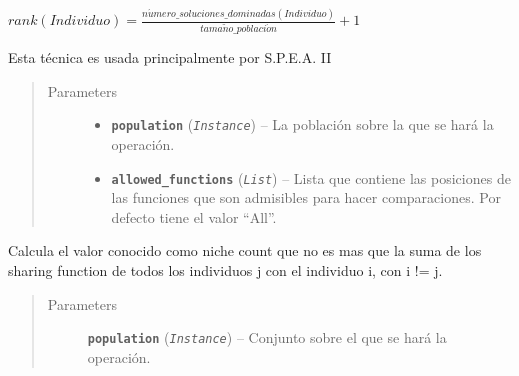 \documentclass[letterpaper,10pt,english]{sphinxmanual}
\begin{document}
\begin{fulllineitems}
\begin{fulllineitems}
\begin{center}\(rank(Individuo) = \frac{n\acute{u}mero\_soluciones\_dominadas(Individuo)}{tama\tilde{n}o\_poblaci\acute{o}n} + 1\)
\end{center}
\begin{DUlineblock}{0em}
\item[] Esta técnica es usada principalmente por S.P.E.A. II
\end{DUlineblock}
\begin{quote}\begin{description}
\item[{Parameters}] \leavevmode\begin{itemize}
\item {} 
\textbf{\texttt{population}} (\emph{\texttt{Instance}}) -- La población sobre la que se hará la operación.

\item {} 
\textbf{\texttt{allowed\_functions}} (\emph{\texttt{List}}) -- Lista que contiene las posiciones de las funciones que son admisibles 
para hacer comparaciones. Por defecto tiene el valor ``All''.

\end{itemize}

\end{description}\end{quote}

\end{fulllineitems}


\begin{fulllineitems}
\label{Model/Community/Community:Model.Community.Community.Community.calculate_population_niche_count}
Calcula el valor conocido como niche count que no es mas que la suma de los sharing function
de todos los individuos j con el individuo i, con i != j.
\begin{quote}\begin{description}
\item[{Parameters}] \leavevmode
\textbf{\texttt{population}} (\emph{\texttt{Instance}}) -- Conjunto sobre el que se hará la operación.

\end{description}\end{quote}

\end{fulllineitems}


\end{fulllineitems}
\end{document}
